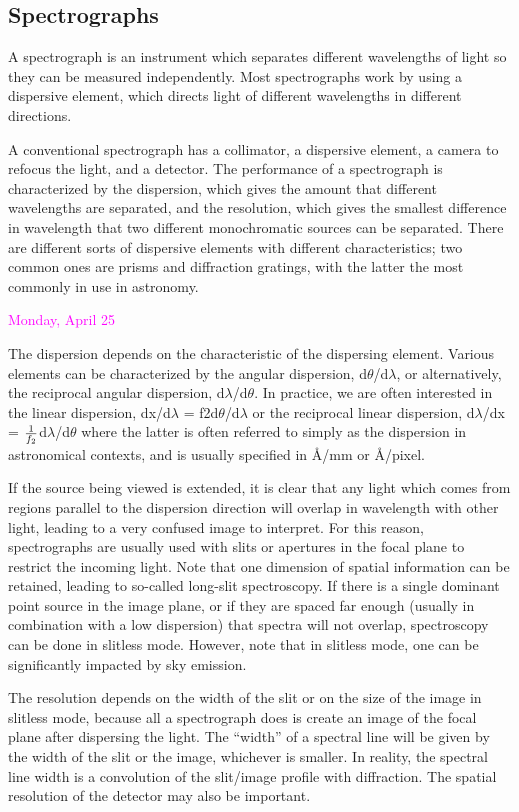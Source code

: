 \documentclass[12pt]{article}
\begin{document}
\subsection*{Spectrographs}
A spectrograph is an instrument which separates different wavelengths
of light so they can be measured independently. Most spectrographs
work by using a dispersive element, which directs light of different
wavelengths in different directions.

A conventional spectrograph has a collimator, a dispersive element, a
camera to refocus the light, and a detector. The performance of a
spectrograph is characterized by the dispersion, which gives the
amount that different wavelengths are separated, and the resolution,
which gives the smallest difference in wavelength that two different
monochromatic sources can be separated. There are different sorts of
dispersive elements with different characteristics; two common ones
are prisms and diffraction gratings, with the latter the most commonly
in use in astronomy.

\textcolor{magenta}{Monday, April 25}

The dispersion depends on the characteristic of the dispersing
element. Various elements can be characterized by the angular
dispersion, d$ \theta$/d$ \lambda$, or alternatively, the reciprocal
angular dispersion, d$ \lambda$/d$ \theta$. In practice, we are often
interested in the linear dispersion, dx/d$ \lambda$ = f2d$ \theta$/d$
\lambda$ or the reciprocal linear dispersion, d$ \lambda$/dx = $
{1\over f_2}$d$ \lambda$/d$ \theta$ where the latter is often referred
to simply as the dispersion in astronomical contexts, and is usually
specified in Å/mm or Å/pixel.

If the source being viewed is extended, it is clear that any light
which comes from regions parallel to the dispersion direction will
overlap in wavelength with other light, leading to a very confused
image to interpret. For this reason, spectrographs are usually used
with slits or apertures in the focal plane to restrict the incoming
light. Note that one dimension of spatial information can be retained,
leading to so-called long-slit spectroscopy. If there is a single
dominant point source in the image plane, or if they are spaced far
enough (usually in combination with a low dispersion) that spectra
will not overlap, spectroscopy can be done in slitless mode. However,
note that in slitless mode, one can be significantly impacted by sky
emission.

The resolution depends on the width of the slit or on the size of the
image in slitless mode, because all a spectrograph does is create an
image of the focal plane after dispersing the light. The ``width'' of
a spectral line will be given by the width of the slit or the image,
whichever is smaller. In reality, the spectral line width is a
convolution of the slit/image profile with diffraction. The spatial
resolution of the detector may also be important.
\end{document}
